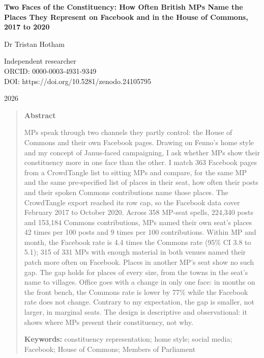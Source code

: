 \documentclass[11pt,a4paper]{article}
\begin{document}
\begin{center}
{\Large\bfseries Two Faces of the Constituency: How Often British MPs Name the Places They Represent on Facebook and in the House of Commons, 2017 to 2020\par}
\vspace{1.2em}
{\large Dr Tristan Hotham\par}
\vspace{0.3em}
{\small Independent researcher\\
ORCID: 0000-0003-4931-9349\\
DOI: https://doi.org/10.5281/zenodo.24105795\par}
\vspace{0.8em}
2026
\end{center}

\begin{quote}
\small
\begin{center}\textbf{Abstract}\end{center}
MPs speak through two channels they partly control: the House of Commons and their own Facebook pages. Drawing on Fenno's home style and my concept of Janus-faced campaigning, I ask whether MPs show their constituency more in one face than the other. I match 363 Facebook pages from a CrowdTangle list to sitting MPs and compare, for the same MP and the same pre-specified list of places in their seat, how often their posts and their spoken Commons contributions name those places. The CrowdTangle export reached its row cap, so the Facebook data cover February 2017 to October 2020. Across 358 MP-seat spells, 224,340 posts and 153,184 Commons contributions, MPs named their own seat's places 42 times per 100 posts and 9 times per 100 contributions. Within MP and month, the Facebook rate is 4.4 times the Commons rate (95\% CI 3.8 to 5.1); 315 of 331 MPs with enough material in both venues named their patch more often on Facebook. Places in another MP's seat show no such gap. The gap holds for places of every size, from the towns in the seat's name to villages. Office goes with a change in only one face: in months on the front bench, the Commons rate is lower by 77\% while the Facebook rate does not change. Contrary to my expectation, the gap is smaller, not larger, in marginal seats. The design is descriptive and observational: it shows where MPs present their constituency, not why.

\textbf{Keywords:} constituency representation; home style; social media; Facebook; House of Commons; Members of Parliament
\end{quote}
\end{document}
